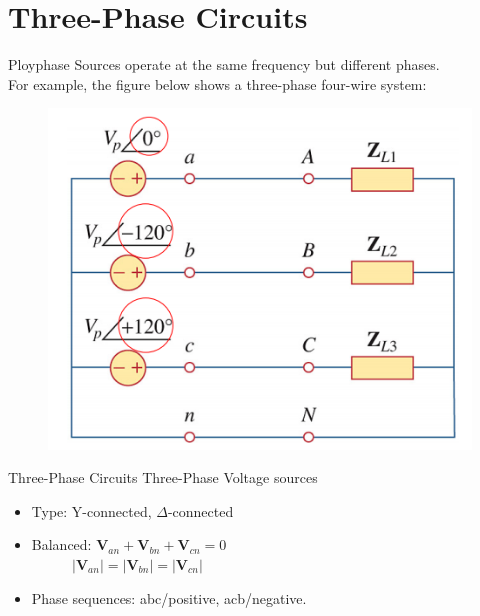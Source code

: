 \documentclass{beamer}
\begin{document}

\section{Three-Phase Circuits}

\begin{frame}{Ployphase}
    Sources operate at the same frequency but different phases. \\
    For example, the figure below shows a three-phase four-wire system:
    \begin{figure}[H]
        \centering
        \includegraphics[scale = 0.7]{C12/1.png}
        \label{fig:enter-label}
    \end{figure}
\end{frame}

\begin{frame}{Three-Phase Circuits}
    Three-Phase Voltage sources
    \begin{itemize}
        \item Type: Y-connected, $\Delta$-connected
        \item Balanced: $\textbf{V}_{an}+\textbf{V}_{bn}+\textbf{V}_{cn} = 0$\\
            $\ \ \ \ \ \ \ \ \ \ \ \ \ |\textbf{V}_{an}|=|\textbf{V}_{bn}|=|\textbf{V}_{cn}|$
        \item Phase sequences: abc/positive, acb/negative.
    \end{itemize}
\end{frame}
\end{document}
